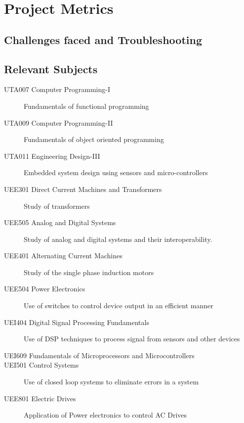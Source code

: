 \chapter{Project Metrics}
        \section{Challenges faced and Troubleshooting}
        \section{Relevant Subjects}
        	\begin{center}
        		\begin{description}
        			\item [UTA007 Computer Programming-I] 
        			Fundamentals of functional programming
        			\item [UTA009 Computer Programming-II] 
        			Fundamentals of object oriented programming
        			\item [UTA011 Engineering Design-III] 
        			Embedded system design using sensors and micro-controllers
        			\item [UEE301 Direct Current Machines and Transformers]
        			Study of transformers
        			\item [UEE505 Analog and Digital Systems] 
        			Study of analog and digital systems and their interoperability.
        			\item [UEE401 Alternating Current Machines] 
        			Study of the single phase induction motors
        			\item [UEE504 Power Electronics] 
        			Use of switches to control device output in an efficient manner
        			\item [UEI404 Digital Signal Processing Fundamentals] 
        			Use of DSP techniques to process signal from sensors and other devices
        			\item [UEI609 Fundamentals of Microprocessors and Microcontrollers] 
        			\item [UEI501 Control Systems] 
        			Use of closed loop systems to eliminate errors in a system 
        			\item [UEE801 Electric Drives] 
        			Application of Power electronics to control AC Drives
        		\end{description}
        	\end{center}
